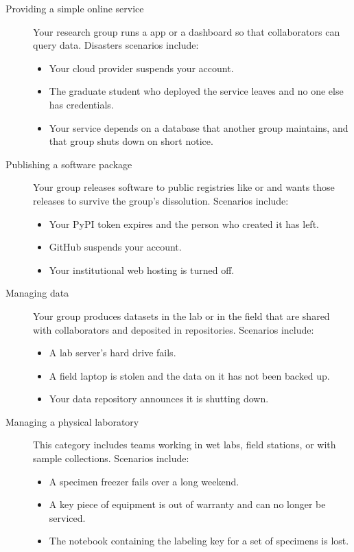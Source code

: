 \documentclass[10pt,letterpaper]{article}
\begin{document}
\begin{description}

\item[Providing a simple online service]
Your research group runs a  app or a 
dashboard so that collaborators can query data.  Disasters scenarios
include:
\begin{itemize}
\item Your cloud provider suspends your account.
\item The graduate student who deployed the service leaves and no one else has credentials.
\item Your service depends on a database that another group maintains, and that group shuts down on short notice.
\end{itemize}

\item[Publishing a software package]
Your group releases software to public registries like  or
 and wants those releases to survive the group's dissolution.
Scenarios include:
\begin{itemize}
\item Your PyPI token expires and the person who created it has left.
\item GitHub suspends your account.
\item Your institutional web hosting is turned off.
\end{itemize}

\item[Managing data]
Your group produces datasets in the lab or in the field that are shared with
collaborators and deposited in repositories.  Scenarios include:
\begin{itemize}
\item A lab server's hard drive fails.
\item A field laptop is stolen and the data on it has not been backed up.
\item Your data repository announces it is shutting down.
\end{itemize}

\item[Managing a physical laboratory]
This category includes teams working in wet labs, field stations, or with
sample collections.  Scenarios include:
\begin{itemize}
\item A specimen freezer fails over a long weekend.
\item A key piece of equipment is out of warranty and can no longer be serviced.
\item The notebook containing the labeling key for a set of specimens is lost.
\end{itemize}

\end{description}
\end{document}
